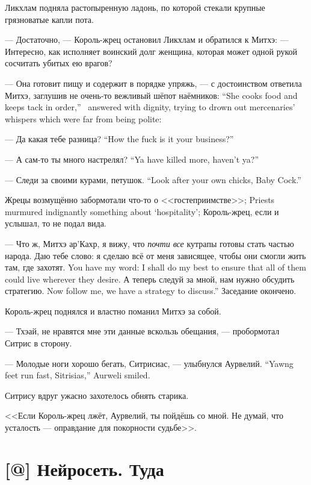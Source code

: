 Ликхлам подняла растопыренную ладонь, по которой стекали крупные грязноватые капли пота.

--- Достаточно, --- Король-жрец остановил Ликхлам и обратился к Митхэ:
--- Интересно, как исполняет воинский долг женщина, которая может одной рукой сосчитать убитых ею врагов?

{--- Она готовит пищу и содержит в порядке упряжь, --- с достоинством ответила Митхэ, заглушив не очень-то вежливый шёпот наёмников:}
{``She cooks food and keeps tack in order,'' \Mitchoe\ answered with dignity, trying to drown out mercenaries' whispers which were far from being polite:}

{--- Да какая тебе разница?}
{``How the fuck is it your business?''}

{--- А сам-то ты много настрелял?}
{``Ya have killed more, haven't ya?''}

{--- Следи за своими курами, петушок.}
{``Look after your own chicks, Baby Cock.''}

{Жрецы возмущённо забормотали что-то о <<гостеприимстве>>;}
{Priests murmured indignantly something about `hospitality';}
Король-жрец, если и услышал, то не подал вида.

--- Что ж, Митхэ ар'Кахр, я вижу, что \emph{почти все} кутрапы готовы стать частью народа.
{Даю тебе слово: я сделаю всё от меня зависящее, чтобы они смогли жить там, где захотят.}
{You have my word: I shall do my best to ensure that all of them could live wherever they desire.}
{А теперь следуй за мной, нам нужно обсудить стратегию.}
{Now follow me, we have a strategy to discuss.''}
Заседание окончено.

Король-жрец поднялся и властно поманил Митхэ за собой.

--- Тхэай, не нравятся мне эти данные вскользь обещания, --- пробормотал Ситрис в сторону.

{--- Молодые ноги хорошо бегать, Ситрисиас, --- улыбнулся Аурвелий.}
{``Yawng feet run fast, Sitrisias,'' Aurweli smiled.}

Ситрису вдруг ужасно захотелось обнять старика.

<<Если Король-жрец лжёт, Аурвелий, ты пойдёшь со мной.
Не думай, что усталость --- оправдание для покорности судьбе>>.

\section{[@] Нейросеть. Туда}

